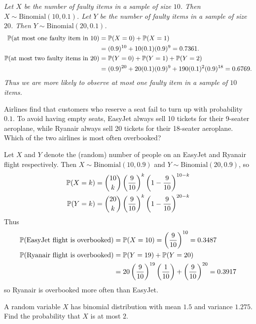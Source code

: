 \begin{exercise}
\begin{questions}
\begin{answer}
\bit
\it Let $X$ be the number of faulty items in a sample of size $10$. Then $X\sim\text{Binomial}(10,0.1)$.
\it Let $Y$ be the number of faulty items in a sample of size $20$. Then $Y\sim\text{Binomial}(20,0.1)$.
\eit
\begin{align*}
\mathbb{P}(\text{at most one faulty item in 10})
	& = \mathbb{P}(X=0) + \mathbb{P}(X=1) \\
	& = (0.9)^{10} + 10(0.1)(0.9)^9 = 0.7361. \\
\mathbb{P}(\text{at most two faulty items in 20})
	& = \mathbb{P}(Y=0) + \mathbb{P}(Y=1) + \mathbb{P}(Y=2) \\
	& = (0.9)^{20} + 20(0.1)(0.9)^9 + 190(0.1)^2(0.9)^{18} = 0.6769.
\end{align*}
Thus we are more likely to observe at most one faulty item in a sample of $10$ items.
\end{answer}

\question %
Airlines find that customers who reserve a seat fail to turn up with probability $0.1$. To avoid having empty seats, EasyJet always sell 10 tickets for their 9-seater aeroplane, while Ryanair always sell 20 tickets for their 18-seater aeroplane. Which of the two airlines is most often overbooked?
\begin{answer}
Let $X$ and $Y$ denote the (random) number of people on an EasyJet and Ryanair flight respectively. Then $X\sim\text{Binomial}(10,0.9)$ and $Y\sim\text{Binomial}(20,0.9)$, so
\begin{align*}
\mathbb{P}(X=k)	& = \binom{10}{k}\left(\frac{9}{10}\right)^k\left(1-\frac{9}{10}\right)^{10-k} \\
\mathbb{P}(Y=k)	& = \binom{20}{k}\left(\frac{9}{10}\right)^k\left(1-\frac{9}{10}\right)^{20-k}
\end{align*}
Thus
\begin{align*}
\mathbb{P}(\text{EasyJet flight is overbooked}) 
	& = \mathbb{P}(X=10) = \left(\frac{9}{10}\right)^{10} = 0.3487 \\
\mathbb{P}(\text{Ryanair flight is overbooked}) 
	& = \mathbb{P}(Y=19)+\mathbb{P}(Y=20) \\
	& = 20\left(\frac{9}{10}\right)^{19}\left(\frac{1}{10}\right) + \left(\frac{9}{10}\right)^{20} = 0.3917
\end{align*}	  
so Ryanair is overbooked more often than EasyJet.
\end{answer}

\question
A random variable $X$ has binomial distribution with mean $1.5$ and variance $1.275$. Find the probability that $X$ is at most $2$.


\end{questions}
\end{exercise}
